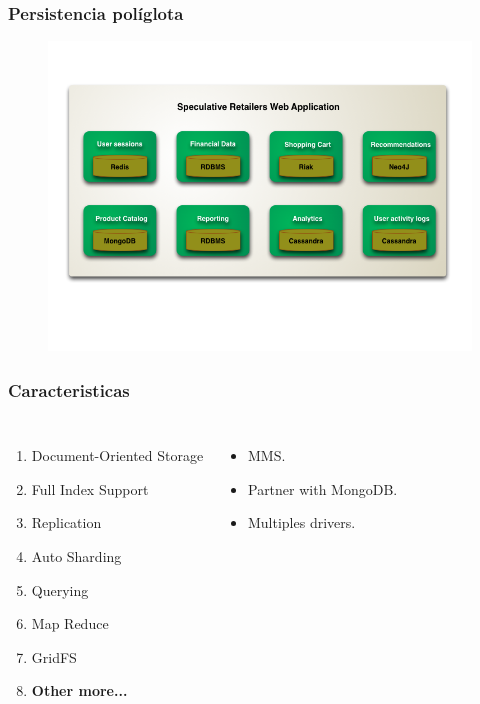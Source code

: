 \documentclass{beamer}
\begin{document}
\begin{frame}
\frametitle{Persistencia pol\'iglota}
\begin{figure}
\includegraphics[width=1.0\linewidth]{polyglot.png}
\end{figure}
\end{frame}

\begin{frame}
\frametitle{Caracteristicas}
\begin{columns}[c]

\begin{enumerate}
\pause
\item Document-Oriented Storage
\pause
\item Full Index Support
\pause
\item Replication
\pause
\item Auto Sharding
\pause
\item Querying
\pause
\item Map Reduce
\pause
\item GridFS
\pause
\item \textbf{Other more...}
\end{enumerate}
\begin{itemize}
\item MMS.
\item Partner with MongoDB.
\item Multiples drivers.
\end{itemize}
\end{columns}
\end{frame}
\end{document}
